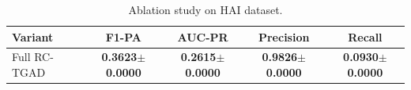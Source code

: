 \begin{table}[h]
\centering
\caption{Ablation study on HAI dataset.}
\label{tab:ablation}
\begin{tabular}{lcccc}
\toprule
\textbf{Variant} & \textbf{F1-PA} & \textbf{AUC-PR} & \textbf{Precision} & \textbf{Recall} \\
\midrule
Full RC-TGAD & \textbf{0.3623$\pm$0.0000} & \textbf{0.2615$\pm$0.0000} & \textbf{0.9826$\pm$0.0000} & \textbf{0.0930$\pm$0.0000} \\
\bottomrule
\end{tabular}
\end{table}